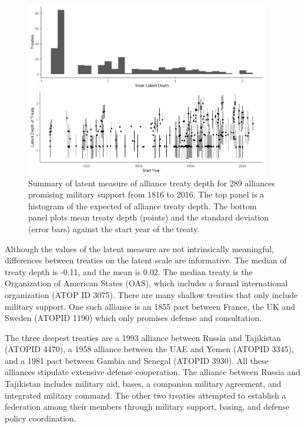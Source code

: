 \documentclass[12pt]{article}
\begin{document}
\begin{figure}
	\centering
		\includegraphics[width=0.95\textwidth]{../figures/ld-summary.png}
	\caption{Summary of latent measure of alliance treaty depth for 289 alliances promising military support from 1816 to 2016. The top panel is a histogram of the expected of alliance treaty depth. The bottom panel plots mean treaty depth (points) and the standard deviation (error bars) against the start year of the treaty.}
	\label{fig:ld-summary}
\end{figure}


Although the values of the latent measure are not intrinsically meaningful, differences between treaties on the latent scale are informative. 
The median of treaty depth is -0.11, and the mean is 0.02. 
The median treaty is the Organization of American States (OAS), which includes a formal international organization (ATOP ID 3075). 
There are many shallow treaties that only include military support. 
One such alliance is an 1855 pact between France, the UK and Sweden (ATOPID 1190) which only promises defense and consultation. 


The three deepest treaties are a 1993 alliance between Russia and Tajikistan (ATOPID 4470), a 1958 alliance between the UAE and Yemen (ATOPID 3345), and a 1981 pact between Gambia and Senegal (ATOPID 3930). 
All these alliances stipulate extensive defense cooperation. 
The alliance between Russia and Tajikistan includes military aid, bases, a companion military agreement, and integrated military command. 
The other two treaties attempted to establish a federation among their members through military support, basing, and defense policy coordination. 
\end{document}

